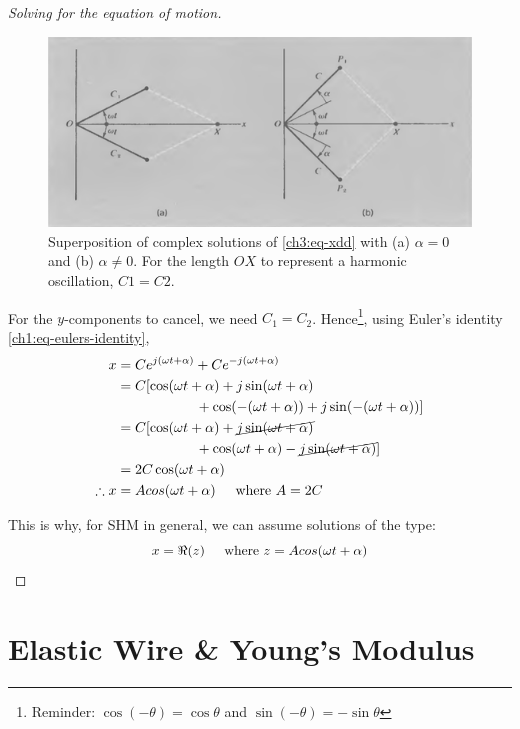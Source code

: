 \begin{proof}[Solving for the equation of motion]
\begin{figure}
	\centering
	\includegraphics[scale=0.5]{phys232/Ch3-adding-complex-solutions.png} \caption{Superposition of complex solutions of \eqref{ch3:eq-xdd} with (a) $\alpha=0$ and (b) $\alpha\neq 0$. For the length $OX$ to represent a harmonic oscillation, $C1=C2$.}
	\label{ch3:fig-complex-sols}
\end{figure}


For the $y$-components to cancel, we need $C_1=C_2$. Hence\footnote{Reminder: $\cos(-\theta)=\cos\theta$ and $\sin(-\theta)=-\sin\theta$}, using Euler's identity \eqref{ch1:eq-eulers-identity},
\begin{align*}
x
&=Ce^{j(\omega t +\alpha)} + Ce^{-j(\omega t +\alpha)} \\
&=C[\cos(\omega t + \alpha) + j\sin(\omega t + \alpha) \\
&\hhtab\hhtab + \cos(-(\omega t + \alpha)) + j\sin(-(\omega t + \alpha))] \\
&=C[\cos(\omega t + \alpha) + \cancel{j\sin(\omega t + \alpha)} \\
& \hhtab\hhtab + \cos(\omega t + \alpha) - \cancel{j\sin(\omega t + \alpha)}] \\
&= 2C\cos(\omega t + \alpha) \\
\therefore
x &= Acos(\omega t + \alpha) \where A=2C
\end{align*}

This is why, for SHM in general, we can assume solutions of the type:
\begin{equation}
	x=\Re(z) \hspace{0.5cm}\text{where } z=Acos(\omega t + \alpha)
\end{equation}
\end{proof}


\section{Elastic Wire \& Young's Modulus} \label{ch3:sec-wire}

